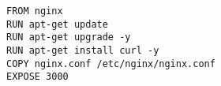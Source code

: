 \begin{verbatim}
FROM nginx
RUN apt-get update
RUN apt-get upgrade -y
RUN apt-get install curl -y
COPY nginx.conf /etc/nginx/nginx.conf
EXPOSE 3000
\end{verbatim}